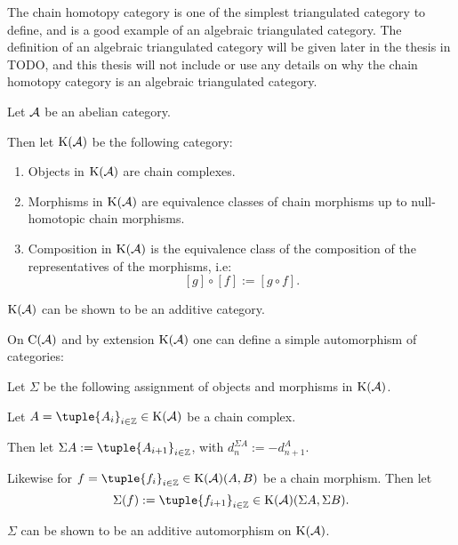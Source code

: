 The chain homotopy category is one of the simplest triangulated category to define, and is a good example of an algebraic triangulated category. The definition of an algebraic triangulated category will be given later in the thesis in TODO, and this thesis will not include or use any details on why the chain homotopy category is an algebraic triangulated category.

\begin{definition}
    \label{def:chain_homotopy_cat}
    Let \( {\mathcal{A}} \) be an abelian category.

    Then let \( \operatorname{K}({\mathcal{A}}) \) be the following category:
    \begin{enumerate}
        \item {
            Objects in \( \operatorname{K}({\mathcal{A}}) \) are chain complexes.
        }
        \item {
            Morphisms in \( \operatorname{K}({\mathcal{A}}) \) are equivalence classes of chain morphisms up to null-homotopic chain morphisms.
        }
        \item {
            Composition in \( \operatorname{K}({\mathcal{A}}) \) is the equivalence class of the composition of the representatives of the morphisms, i.e:
            \[
                [g] \circ [f] := [g \circ f ].
            \]
        }
    \end{enumerate}
\end{definition}

\( \operatorname{K}({\mathcal{A}}) \) can be shown to be an additive category.

On \( \operatorname{C}({\mathcal{A}}) \) and by extension \( \operatorname{K}({\mathcal{A}}) \) one can define a simple automorphism of categories:

\begin{definition}
    \label{def:chain_homotopy_shift}
    Let \( \Sigma \) be the following assignment of objects and morphisms in \( \operatorname{K}({\mathcal{A}}) \).

    Let \( A = \tuple{A_i}_{i \in \Zb} \in \K(\Ac) \) be a chain complex.

    Then let \( \Sigma A := \tuple{A_{i + 1}}_{i \in \Zb} \), with \( d_n^{\Sigma A} := -d_{n + 1}^A \).

    Likewise for \( f = \tuple{f_i}_{i \in \Zb} \in \K(\Ac)(A, B) \) be a chain morphism. Then let
    \[
        \Sigma(f) := \tuple{f_{i + 1}}_{i \in \Zb} \in \K(\Ac)(\Sigma A, \Sigma B).
    \]
\end{definition}

\( \Sigma \) can be shown to be an additive automorphism on \( \operatorname{K}({\mathcal{A}}) \).

